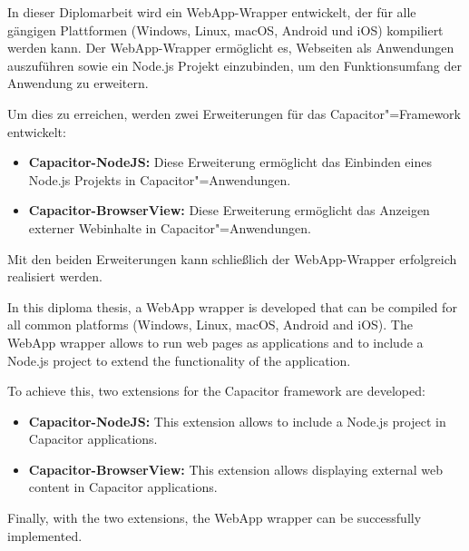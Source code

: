 
In dieser Diplomarbeit wird ein WebApp-Wrapper entwickelt, der für alle gängigen Plattformen (Windows, Linux, macOS, Android und iOS) kompiliert werden kann.
Der WebApp-Wrapper ermöglicht es, Webseiten als Anwendungen auszuführen sowie ein Node.js Projekt einzubinden, um den Funktionsumfang der Anwendung zu erweitern.

Um dies zu erreichen, werden zwei Erweiterungen für das Capacitor"=Framework entwickelt:

\begin{itemize}
  \item \textbf{Capacitor-NodeJS:} Diese Erweiterung ermöglicht das Einbinden eines Node.js Projekts in Capacitor"=Anwendungen.
  \item \textbf{Capacitor-BrowserView:} Diese Erweiterung ermöglicht das Anzeigen externer Webinhalte in Capacitor"=Anwendungen.
\end{itemize}

Mit den beiden Erweiterungen kann schließlich der WebApp-Wrapper erfolgreich realisiert werden.


In this diploma thesis, a WebApp wrapper is developed that can be compiled for all common platforms (Windows, Linux, macOS, Android and iOS).
The WebApp wrapper allows to run web pages as applications and to include a Node.js project to extend the functionality of the application.

To achieve this, two extensions for the Capacitor framework are developed:

\begin{itemize}
  \item \textbf{Capacitor-NodeJS:} This extension allows to include a Node.js project in Capacitor applications.
  \item \textbf{Capacitor-BrowserView:} This extension allows displaying external web content in Capacitor applications.
\end{itemize}

Finally, with the two extensions, the WebApp wrapper can be successfully implemented.

